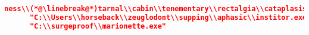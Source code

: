 \begin{lstlisting}[language=json,label=lst:example_report_adv, caption=Modified report entries]
ness\\(*@\linebreak@*)tarnal\\cabin\\tenementary\\rectalgia\\cataplasis\\flavor\\(*@\linebreak@*)sprank\\rigor\\unwrinkle\\partitionary\\dancery\\demihigh\\(*@\linebreak@*)warrantee\\sherifate\\thereout\\fourteenthly\\mousefish\\(*@\linebreak@*)unfairylike\\tenaille\\iodobromite\\octoglot\\Cartist\\(*@\linebreak@*)heartscald\\wellsite\\triphony\\picturely\\zoning\\deal\\pyelectasis\\(*@\linebreak@*)unselfish\\marshite\\truckful\\beworn\\thriller\\divaricately\\Earnie",
      "C:\\Users\\horseback\\zeuglodont\\supping\\aphasic\\institor.exe",
      "C:\\surgeproof\\marionette.exe"
      

\end{lstlisting}
